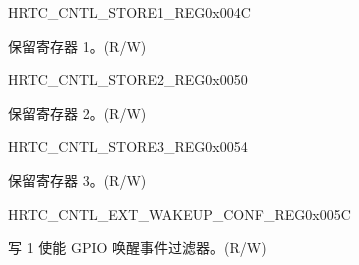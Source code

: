 \begin{register}{H}{RTC\_CNTL\_STORE1\_REG}{0x004C}\label{regdesc:RTCCNTLSTORE1REG}
%
\regnewline%
\begin{regdesc}\begin{reglist}
\label{fielddesc:RTCCNTLSCRATCH1}\item [RTC\_CNTL\_SCRATCH1] 保留寄存器 1。(R/W)
\end{reglist}\end{regdesc}
\end{register}


\begin{register}{H}{RTC\_CNTL\_STORE2\_REG}{0x0050}\label{regdesc:RTCCNTLSTORE2REG}
%
\regnewline%
\begin{regdesc}\begin{reglist}
\label{fielddesc:RTCCNTLSCRATCH2}\item [RTC\_CNTL\_SCRATCH2] 保留寄存器 2。(R/W)
\end{reglist}\end{regdesc}
\end{register}


\begin{register}{H}{RTC\_CNTL\_STORE3\_REG}{0x0054}\label{regdesc:RTCCNTLSTORE3REG}
%
\regnewline%
\begin{regdesc}\begin{reglist}
\label{fielddesc:RTCCNTLSCRATCH3}\item [RTC\_CNTL\_SCRATCH3] 保留寄存器 3。(R/W)
\end{reglist}\end{regdesc}
\end{register}


\begin{register}{H}{RTC\_CNTL\_EXT\_WAKEUP\_CONF\_REG}{0x005C}\label{regdesc:RTCCNTLEXTWAKEUPCONFREG}
%
%
\regnewline%
\begin{regdesc}\begin{reglist}
\label{fielddesc:RTCCNTLGPIOWAKEUPFILTER}\item [RTC\_CNTL\_GPIO\_WAKEUP\_FILTER] 写 1 使能 GPIO 唤醒事件过滤器。(R/W)
\end{reglist}\end{regdesc}
\end{register}


